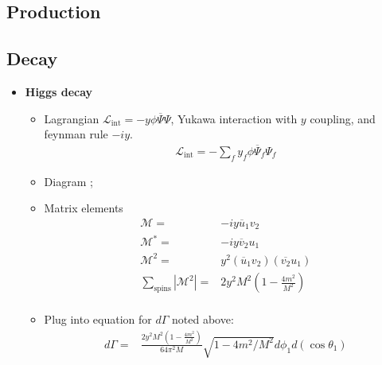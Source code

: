 \subsection{Production}

\subsection{Decay}
\begin{itemize}
    \item \textbf{Higgs decay} \cite{wells}
    \begin{itemize}
        \item Lagrangian $\mathcal{L}_\text{int}=-y\phi\overline{\Psi}\Psi$, Yukawa interaction with $y$ coupling, and feynman rule $-iy$. \cite{wells}
        \begin{equation}\begin{split}
            \mathcal{L}_\text{int}=-\sum_fy_f\phi\overline{\Psi}_f\Psi_f
        \end{split}\end{equation}
        \item Diagram \cite{wells}
            ;
        \item Matrix elements \cite{wells}
        \begin{equation}\begin{split}
            \mathcal{M}=&-iy\overline{u}_1v_2 \\
            \mathcal{M}^*=&-iy\overline{v}_2u_1 \\
            \mathcal{M}^2=&y^2(\overline{u}_1v_2)(\overline{v_2}u_1) \\
            \sum_\text{spins}|\mathcal{M}^2|=&2y^2M^2\left(1-\frac{4m^2}{M^2}\right) \\
        \end{split}\end{equation}
        \item Plug into equation for $d\Gamma$ noted above: \cite{wells}
        \begin{equation}\begin{split}
            d\Gamma=&\frac{2y^2M^2\left(1-\frac{4m^2}{M^2}\right)}{64\pi^2M}\sqrt{1-4m^2/M^2}d\phi_1d(\cos\theta_1) \\

\end{split}
\end{equation}
\end{itemize}
\end{itemize}
